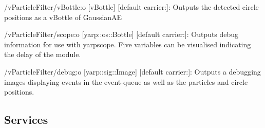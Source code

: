 \begin{DoxyItemize}
\item /v\+Particle\+Filter/v\+Bottle\+:o \mbox{[}v\+Bottle\mbox{]} \mbox{[}default carrier\+:\mbox{]}\+: Outputs the detected circle positions as a v\+Bottle of Gaussian\+AE
\item /v\+Particle\+Filter/scope\+:o \mbox{[}yarp\+::os\+::\+Bottle\mbox{]} \mbox{[}default carrier\+:\mbox{]}\+: Outputs debug information for use with yarpscope. Five variables can be visualised indicating the delay of the module.
\item /v\+Particle\+Filter/debug\+:o \mbox{[}yarp\+::sig\+::\+Image\mbox{]} \mbox{[}default carrier\+:\mbox{]}\+: Outputs a debugging images displaying events in the event-\/queue as well as the particles and circle positions.
\end{DoxyItemize}\hypertarget{group__zynqGrabber_services_sec}{}\subsection{Services}\label{group__zynqGrabber_services_sec}
